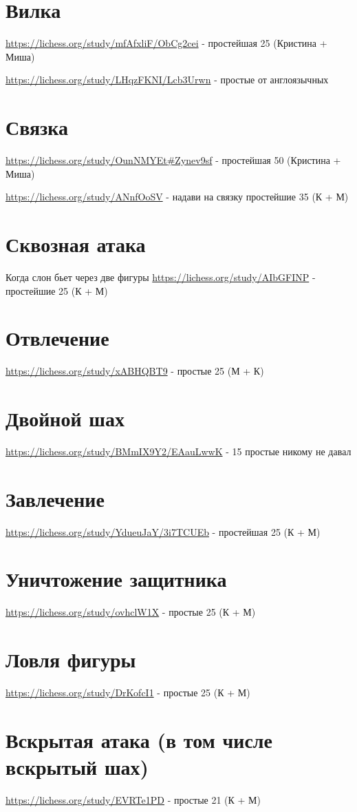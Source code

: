 \documentclass{article}
\begin{document}
\section{Вилка}
\url{https://lichess.org/study/mfAfxliF/ObCg2cei} - простейшая 25 
(Кристина + Миша)

\url{https://lichess.org/study/LHqzFKNI/Lcb3Urwn} - простые от англоязычных
\section{Связка}
\url{https://lichess.org/study/OunNMYEt#Zynev9sf} - простейшая 50
(Кристина + Миша)

\url{https://lichess.org/study/ANnfOoSV} - надави на связку
простейшие 35 (К + М)


\section{Сквозная атака}
Когда слон бьет через две фигуры
\url{https://lichess.org/study/AIbGFINP} - простейшие 25 (К + М)
\section{Отвлечение}
\url{https://lichess.org/study/xABHQBT9} - простые 25 (М + К)
\section{Двойной шах}
\url{https://lichess.org/study/BMmIX9Y2/EAauLwwK} - 15 простые никому не давал
\section{Завлечение}
\url{https://lichess.org/study/YdueuJaY/3i7TCUEb} - простейшая 25 (К + М)


\section{Уничтожение защитника}
\url{https://lichess.org/study/ovhclW1X} - простые 25 (К + М)

\section{Ловля фигуры}
\url{https://lichess.org/study/DrKofcI1} - простые 25 (К + М)
\section{Вскрытая атака (в том числе вскрытый шах)}
\url{https://lichess.org/study/EVRTe1PD} - простые 21 (К + М)
\end{document}
